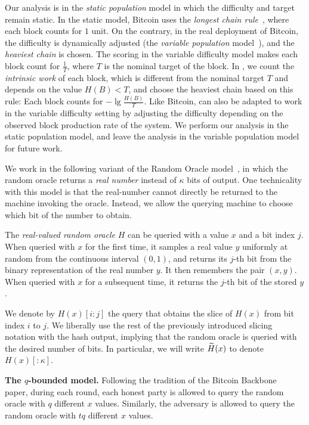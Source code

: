 \noindent
{}
Our analysis is in the \emph{static population} model in which the difficulty
and target remain static. In the static model, Bitcoin uses the \emph{longest chain rule}~\cite{backbone},
where each block counts for $1$ unit.
On the contrary, in the real deployment of Bitcoin, the difficulty is dynamically adjusted (the
\emph{variable population} model~\cite{varbackbone}), and the \emph{heaviest chain} is chosen.
The scoring in the variable difficulty model makes each block count for $\frac{1}{T}$, where
$T$ is the nominal target of the block. In \poem, we count the \emph{intrinsic work}
of each block, which is different from the nominal target $T$ and depends on the value $H(B) < T$,
and choose the heaviest chain based on this rule: Each block counts for $-\lg\frac{H(B)}{T}$.
Like Bitcoin, \poem can also be adapted to work in the variable difficulty setting by adjusting
the difficulty depending on the observed block production rate of the system.
We perform our analysis in the static population model, and leave the analysis in the variable
population model for future work.

We work in the following variant of the Random Oracle model~\cite{ro}, in which
the random oracle returns a \emph{real number} instead of $\kappa$ bits of output.
One technicality with this model is that the real-number cannot directly be returned
to the machine invoking the oracle. Instead, we allow the querying machine to choose which
bit of the number to obtain.

\begin{definition}
  The \emph{real-valued random oracle} $H$ can be queried with a value $x$ and a bit index $j$.
  When queried with $x$ for the first time,
  it samples a real value $y$ uniformly at random from the continuous interval $(0, 1)$,
  and returns its $j$-th bit from the binary representation of the real number $y$.
  It then remembers the pair $(x, y)$.
  When queried with $x$ for a subsequent time, it returns the $j$-th bit
  of the stored $y$.
\end{definition}

We denote by $H(x)[{i}{:}{j}]$ the query that obtains the slice of $H(x)$ from bit index $i$ to $j$.
We liberally use the rest of the previously introduced slicing notation with the hash output,
implying that the random oracle is queried with the desired number of bits.
In particular, we will write $\widetilde{H}(x)$ to denote $H(x)[{:}{\kappa}]$.

\noindent
\textbf{The $q$-bounded model.}
Following the tradition of the Bitcoin Backbone~\cite{backbone} paper,
during each round, each honest party is allowed to query the random oracle with $q$
different $x$ values. Similarly, the adversary is allowed to query the random oracle
with $t q$ different $x$ values.